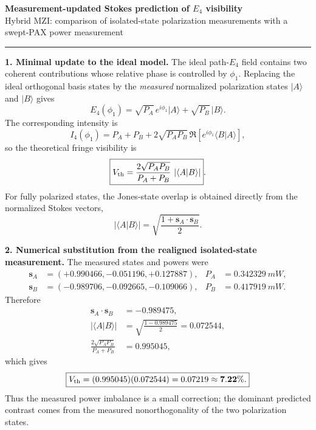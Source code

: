 \documentclass[10pt]{article}
\newcommand{\vect}[1]{\bm{#1}}
\begin{document}
{\Large\bfseries Measurement-updated Stokes prediction of $E_4$ visibility}\\[-1pt]
{\small Hybrid MZI: comparison of isolated-state polarization measurements with a swept-PAX power measurement}

\vspace{4pt}
\hrule
\vspace{5pt}

\textbf{1. Minimal update to the ideal model.}
The ideal path-$E_4$ field contains two coherent contributions whose relative phase is controlled by $\phi_1$. Replacing the ideal orthogonal basis states by the \emph{measured} normalized polarization states $\lvert A\rangle$ and $\lvert B\rangle$ gives
\begin{equation}
E_4(\phi_1)=\sqrt{P_A}\,e^{i\phi_1}\lvert A\rangle+\sqrt{P_B}\,\lvert B\rangle .
\end{equation}
The corresponding intensity is
\begin{equation}
I_4(\phi_1)=P_A+P_B+2\sqrt{P_AP_B}\,\Re\!\left[e^{i\phi_1}\langle B\vert A\rangle\right],
\end{equation}
so the theoretical fringe visibility is
\begin{equation}
\boxed{V_{\rm th}=\frac{2\sqrt{P_AP_B}}{P_A+P_B}\,\left|\langle A\vert B\rangle\right|}.
\end{equation}
For fully polarized states, the Jones-state overlap is obtained directly from the normalized Stokes vectors,
\begin{equation}
\left|\langle A\vert B\rangle\right|=
\sqrt{\frac{1+\vect{s}_A\!\cdot\!\vect{s}_B}{2}}.
\end{equation}

\textbf{2. Numerical substitution from the realigned isolated-state measurement.}
The measured states and powers were
\begin{align*}
\vect{s}_A&=(+0.990466,-0.051196,+0.127887), & P_A&=\SI{0.342329}{mW},\\
\vect{s}_B&=(-0.989706,-0.092665,-0.109066), & P_B&=\SI{0.417919}{mW}.
\end{align*}
Therefore
\begin{align*}
\vect{s}_A\cdot\vect{s}_B&=-0.989475,\\
\left|\langle A\vert B\rangle\right|&=\sqrt{\frac{1-0.989475}{2}}=0.072544,\\
\frac{2\sqrt{P_AP_B}}{P_A+P_B}&=0.995045,
\end{align*}
which gives
\begin{equation}
\boxed{V_{\rm th}=(0.995045)(0.072544)=0.07219\approx\mathbf{7.22\%}.}
\end{equation}
Thus the measured power imbalance is a small correction; the dominant predicted contrast comes from the measured nonorthogonality of the two polarization states.
\end{document}
